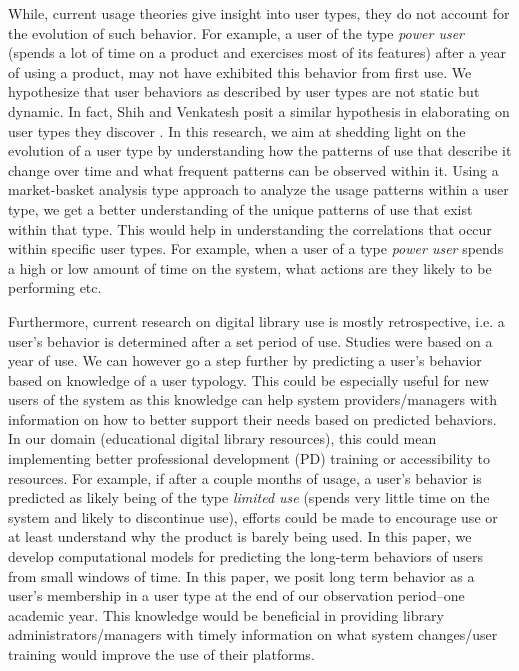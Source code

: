 \documentclass{acm_proc_article-sp}
\begin{document}
While, current usage theories give insight into user types, they do not account for the evolution of such behavior. For example, a user of the type \textit{power user} (spends a lot of time on a product and exercises most of its features) after a year of using a product, may not have exhibited this behavior from first use. We hypothesize that user behaviors as described by user types are not static but dynamic. In fact, Shih and Venkatesh posit a similar hypothesis in elaborating on user types they discover \cite{shih2004beyond}. In this research, we aim at shedding light on the evolution of a user type by understanding how the patterns of use that describe it change over time and what frequent patterns can be observed within it. Using a market-basket analysis type approach to analyze the usage patterns within a user type, we get a better understanding of the unique patterns of use that exist within that type. This would help in understanding the correlations that occur within specific user types. For example, when a user of a type \textit{power user} spends a high or low amount of time on the system, what actions are they likely to be performing etc.

Furthermore, current research on digital library use is mostly retrospective, i.e. a user's behavior is determined after a set period of use. Studies \cite{maullunderstanding,xu} were based on a year of use. We can however go a step further by predicting a user's behavior based on knowledge of a user typology. This could be especially useful for new users of the system as this knowledge can help system providers/managers with information on how to better support their needs based on predicted behaviors. In our domain (educational digital library resources), this could mean implementing better professional development (PD) training or accessibility to resources. For example, if after a couple months of usage, a user's behavior is predicted as likely being of the type \textit{limited use} (spends very little time on the system and likely to discontinue use), efforts could be made to encourage use or at least understand why the product is barely being used. In this paper, we develop computational models for predicting the long-term behaviors of users from small windows of time. In this paper, we posit long term behavior as a user's membership in a user type at the end of our observation period--one academic year. This knowledge would be beneficial in providing library administrators/managers with timely information on what system changes/user training would improve the use of their platforms.
\end{document}
